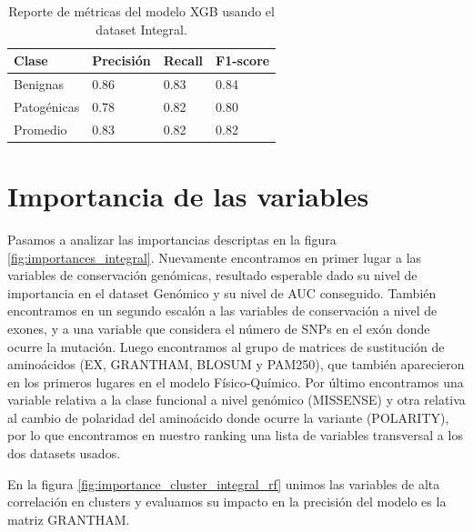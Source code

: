 \begin{table}[H]
\centering
\begin{tabular}{|l|l|l|l|}
\hline
Clase        & Precisión & Recall & F1-score \\ \hline
Benignas     & 0.86      & 0.83   & 0.84     \\ \hline
Patogénicas  & 0.78      & 0.82   & 0.80     \\ \hline
Promedio     & 0.83      & 0.82   & 0.82     \\ \hline
\end{tabular}
\caption{Reporte de métricas del modelo XGB usando el dataset Integral.}
\label{tab:metrics_integral_xgb}
\end{table}




\section{Importancia de las variables}

Pasamos a analizar las importancias descriptas en la figura \ref{fig:importances_integral}. Nuevamente encontramos en primer lugar a las variables de conservación genómicas, resultado esperable dado su nivel de importancia en el dataset Genómico y su nivel de AUC conseguido. También encontramos en un segundo escalón a las variables de conservación a nivel de exones, y a una variable que considera el número de SNPs en el exón donde ocurre la mutación. Luego encontramos al grupo de matrices de sustitución de aminoácidos (EX, GRANTHAM, BLOSUM y PAM250), que también aparecieron en los primeros lugares en el modelo Físico-Químico. Por último encontramos una variable relativa a la clase funcional a nivel genómico (MISSENSE) y otra relativa al cambio de polaridad del aminoácido donde ocurre la variante (POLARITY), por lo que encontramos en nuestro ranking una lista de variables transversal a los dos datasets usados. 

En la figura \ref{fig:importance_cluster_integral_rf} unimos las variables de alta correlación en clusters y evaluamos su impacto en la precisión del modelo es la matriz GRANTHAM.





